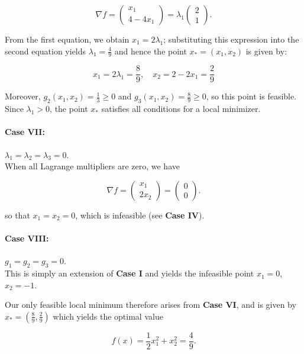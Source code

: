 \begin{solution}
    $$
    \nabla f = \begin{pmatrix*}
           x_1 \\
           4 - 4 x_1
    \end{pmatrix*} = \lambda_1 \begin{pmatrix*}
           2 \\
           1
    \end{pmatrix*}.
    $$

    From the first equation, we obtain $x_1 = 2 \lambda_1$; substituting this expression into the second equation yields
    $\lambda_1 = \frac{4}{9}$ and hence the point $x_* = (x_1, x_2)$ is given by:

    $$
    x_1 = 2 \lambda_1 = \frac{8}{9}, \quad x_2 = 2 - 2 x_1 = \frac{2}{9}
    $$

    Moreover, $g_2(x_1, x_2) = \frac{1}{3} \ge 0$ and $g_3(x_1, x_2) = \frac{8}{9} \ge 0$, so this point is feasible.
    Since $\lambda_1 > 0$, the point $x_*$ satisfies all conditions for a local minimizer.

    \pagebreak
    \paragraph{Case VII:} $\lambda_1 = \lambda_2 = \lambda_3 = 0.$ \ \\
    When all Lagrange multipliers are zero, we have

    $$
    \nabla f = \begin{pmatrix*}
           x_1 \\
         2 x_2
    \end{pmatrix*} = \begin{pmatrix*}
           0 \\
           0
    \end{pmatrix*}.
    $$

    so that $x_1 = x_2 = 0$, which is infeasible (see \textbf{Case IV}).

    \paragraph{Case VIII:} $g_1 = g_2 = g_3 = 0.$ \ \\
    This is simply an extension of \textbf{Case I} and yields the infeasible point $x_1 = 0$, $x_2 = -1$.

    Our only feasible local minimum therefore arises from \textbf{Case VI}, and is given by \linebreak
    $x_* = \left( \frac{8}{9}, \frac{2}{9} \right)$ which yields the optimal value

    $$
    f(x) = \frac{1}{2}x_1^2 + x_2^2 = \frac{4}{9}.
    $$
    \ \\
\end{solution}